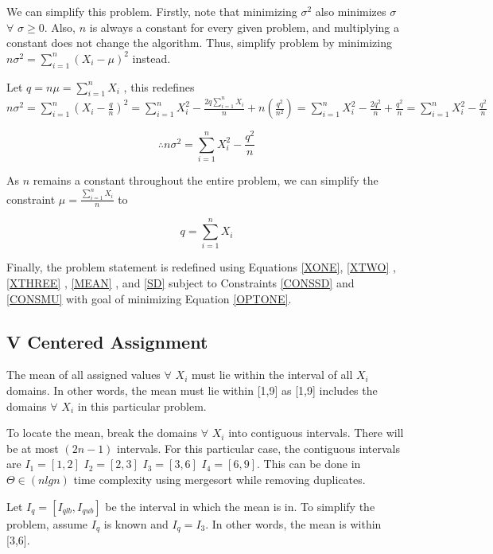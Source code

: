 \documentclass[a4paper,12pt]{article}
\begin{document}
We can simplify this problem. Firstly, note that minimizing $\sigma^2$ also minimizes $\sigma$ $\forall$ $\sigma \geq 0$. Also, $n$ is always a constant for every given problem, and multiplying a constant does not change the algorithm. Thus, simplify problem by minimizing 
$n\sigma^2 =  \sum\limits_{i=1}^n (X_{i} - \mu)^2$ instead. 

Let $q = n\mu =  \sum\limits_{i=1}^n X_{i}$ , 
this redefines 
$n\sigma^2 =  \sum\limits_{i=1}^n (X_{i} - \frac{q}{n})^2 = 
\sum\limits_{i=1}^n X_{i}^2 - \frac{2q\sum\limits_{i=1}^n X_{i}}{n} + n(\frac{q^2}{n^2}) = \sum\limits_{i=1}^n X_{i}^2 - \frac{2q^2}{n} + \frac{q^2}{n} =  \sum\limits_{i=1}^n X_{i}^2 - \frac{q^2}{n}$


\begin{equation}
\label{OPTONE}\therefore n\sigma^2 = \sum\limits_{i=1}^n X_{i}^2 - \frac{q^2}{n}
\end{equation} 


As $n$ remains a constant throughout the entire problem, 
we can simplify the constraint 
$\mu = \frac{\sum\limits_{i=1}^n X_{i}}{n}$ to

\begin{equation}
\label{CONSMU} q = \sum\limits_{i=1}^n X_{i}
\end{equation} 


Finally, the problem statement is redefined using Equations \ref{XONE}, \ref{XTWO} , \ref{XTHREE} , \ref{MEAN} , and \ref{SD} 
subject to Constraints \ref{CONSSD} and \ref{CONSMU} with goal of minimizing Equation \ref{OPTONE}. 

\subsection{V Centered Assignment}
The mean of all assigned values $\forall$ $X_{i}$ must lie within the interval of all $X_{i}$ domains. In other words, the mean must lie within [1,9] as [1,9] includes the domains $\forall$ $X_{i}$ in this particular problem. 

To locate the mean, break the domains $\forall$ $X_{i}$ into contiguous intervals. 
There will be at most $(2n - 1)$ intervals. For this particular case, the contiguous intervals are 
$I_{1} = [1,2]$ $I_{2} = [2,3]$ $I_{3} = [3,6]$  $I_{4} = [6,9]$. This can be done in $\Theta \in (nlgn)$ time complexity using mergesort while removing duplicates. 

Let $I_{q} = [I_{qlb}, I_{qub}]$ be the interval in which the mean is in. 
To simplify the problem, assume $I_{q}$ is known and $I_{q} = I_{3} $. In other words, the mean is within [3,6]. 
\end{document}
